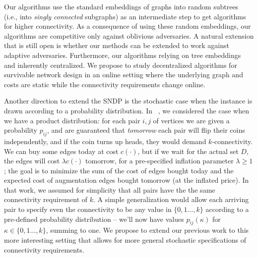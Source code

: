 Our algorithms use the standard embeddings of graphs into random
subtrees (i.e., into \emph{singly connected} subgraphs) as an
intermediate step to get algorithms for higher connectivity. As a
consequence of using these random embeddings, our algorithms are
competitive only against oblivious adversaries. A natural extension
that is still open is whether our methods can be extended to work
against adaptive adversaries.  Furthermore, our algorithms relying on
tree embeddings and inherently centralized.  We propose to study
decentralized algorithms for survivable network design in an online
setting where the underlying graph and costs are static while the
connectivity requirements change online.


Another direction to extend the SNDP is the
stochastic case when the instance is drawn according to a probability
distribution. In ~\cite{gkr10}, we considered the case when we have a product
distribution: for each pair $i,j$ of vertices we are given a probability $p_{ij}$,
and are guaranteed that \emph{tomorrow} each pair will flip their coins
independently, and if the coin turns up heads, they would demand
$k$-connectivity. We can buy some edges today at cost $c(\cdot)$, but if
we wait for the actual set $D$, the edges will cost $\lambda c(\cdot)$
tomorrow, for a pre-specified inflation parameter $\lambda \geq 1$; the goal
is to minimize the sum of the cost of edges bought today and the
expected cost of augmentation edges bought tomorrow (at the inflated price).
In that work, we assumed for simplicity that all pairs have the the same
connectivity requirement of $k$. A simple generalization would allow each arriving pair to specify even the connectivity to be any value in $\{0,1\ldots,k\}$ according to a pre-defined probability distribution -- we'll now have values $p_{ij}(\kappa)$ for $\kappa \in \{0,1\ldots,k\}$, summing to one. We propose to extend our previous work to this more interesting setting that allows for more general stochastic specifications of connectivity requirements.

